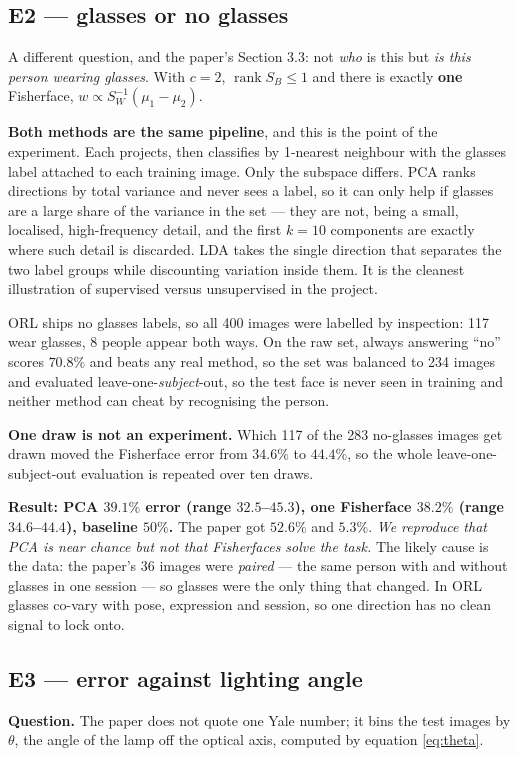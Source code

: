 \documentclass[11pt]{article}
\begin{document}
\subsection{E2 --- glasses or no glasses}
A different question, and the paper's Section 3.3: not \emph{who} is this but
\emph{is this person wearing glasses}. With $c=2$,
$\operatorname{rank}S_B\le1$ and there is exactly \textbf{one} Fisherface,
$w\propto S_W^{-1}(\mu_1-\mu_2)$.

\textbf{Both methods are the same pipeline}, and this is the point of the
experiment. Each projects, then classifies by 1-nearest neighbour with the
glasses label attached to each training image. Only the subspace differs. PCA
ranks directions by total variance and never sees a label, so it can only help
if glasses are a large share of the variance in the set --- they are not, being
a small, localised, high-frequency detail, and the first $k=10$ components are
exactly where such detail is discarded. LDA takes the single direction that
separates the two label groups while discounting variation inside them. It is
the cleanest illustration of supervised versus unsupervised in the project.

ORL ships no glasses labels, so all 400 images were labelled by inspection: 117
wear glasses, 8 people appear both ways. On the raw set, always answering
``no'' scores $70.8\%$ and beats any real method, so the set was balanced to
234 images and evaluated leave-one-\emph{subject}-out, so the test face is never
seen in training and neither method can cheat by recognising the person.

\textbf{One draw is not an experiment.} Which 117 of the 283 no-glasses images
get drawn moved the Fisherface error from $34.6\%$ to $44.4\%$, so the whole
leave-one-subject-out evaluation is repeated over ten draws.

\textbf{Result: PCA $39.1\%$ error (range $32.5$--$45.3$), one Fisherface
$38.2\%$ (range $34.6$--$44.4$), baseline $50\%$.}
The paper got $52.6\%$ and $5.3\%$. \emph{We reproduce that PCA is near chance
but not that Fisherfaces solve the task.} The likely cause is the data: the
paper's 36 images were \emph{paired} --- the same person with and without
glasses in one session --- so glasses were the only thing that changed. In ORL
glasses co-vary with pose, expression and session, so one direction has no
clean signal to lock onto.

\subsection{E3 --- error against lighting angle}
\textbf{Question.} The paper does not quote one Yale number; it bins the test
images by $\theta$, the angle of the lamp off the optical axis, computed by
equation \eqref{eq:theta}.
\end{document}
